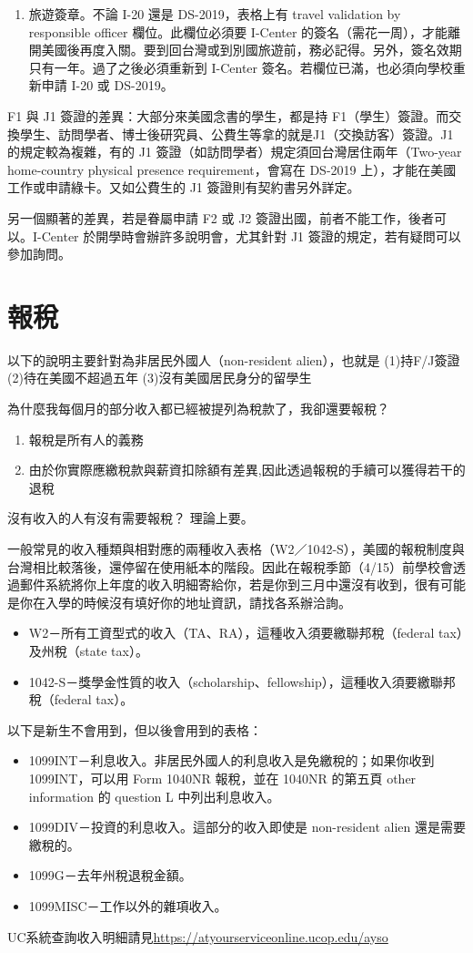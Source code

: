 \documentclass[10pt,a4paper]{book}
\begin{document}
\begin{CJK}{UTF8}{bkai}
\begin{enumerate}
\item 旅遊簽章。不論 I-20 還是 DS-2019，表格上有 travel validation by responsible officer 欄位。此欄位必須要 I-Center 的簽名（需花一周），才能離開美國後再度入關。要到回台灣或到別國旅遊前，務必記得。另外，簽名效期只有一年。過了之後必須重新到 I-Center 簽名。若欄位已滿，也必須向學校重新申請 I-20 或 DS-2019。
\end{enumerate}

F1 與 J1 簽證的差異：大部分來美國念書的學生，都是持 F1（學生）簽證。而交換學生、訪問學者、博士後研究員、公費生等拿的就是J1（交換訪客）簽證。J1 的規定較為複雜，有的 J1 簽證（如訪問學者）規定須回台灣居住兩年（Two-year home-country physical presence requirement，會寫在 DS-2019 上），才能在美國工作或申請綠卡。又如公費生的 J1 簽證則有契約書另外詳定。

另一個顯著的差異，若是眷屬申請 F2 或 J2 簽證出國，前者不能工作，後者可以。I-Center 於開學時會辦許多說明會，尤其針對 J1 簽證的規定，若有疑問可以參加詢問。

\section{報稅}
以下的說明主要針對為非居民外國人（non-resident alien），也就是 (1)持F/J簽證 (2)待在美國不超過五年 (3)沒有美國居民身分的留學生

為什麼我每個月的部分收入都已經被提列為稅款了，我卻還要報稅？
\begin{enumerate}
\item 報稅是所有人的義務
\item 由於你實際應繳稅款與薪資扣除額有差異,因此透過報稅的手續可以獲得若干的退稅
\end{enumerate}

沒有收入的人有沒有需要報稅？
理論上要。

一般常見的收入種類與相對應的兩種收入表格（W2／1042-S），美國的報稅制度與台灣相比較落後，還停留在使用紙本的階段。因此在報稅季節（4/15）前學校會透過郵件系統將你上年度的收入明細寄給你，若是你到三月中還沒有收到，很有可能是你在入學的時候沒有填好你的地址資訊，請找各系辦洽詢。
\begin{itemize}
\item W2－所有工資型式的收入（TA、RA），這種收入須要繳聯邦稅（federal tax）及州稅（state tax）。
\item 1042-S－獎學金性質的收入（scholarship、fellowship），這種收入須要繳聯邦稅（federal tax）。
\end{itemize}

以下是新生不會用到，但以後會用到的表格：
\begin{itemize}
\item 1099INT－利息收入。非居民外國人的利息收入是免繳稅的；如果你收到 1099INT，可以用 Form 1040NR 報稅，並在 1040NR 的第五頁 other information 的 question L 中列出利息收入。
\item 1099DIV－投資的利息收入。這部分的收入即使是 non-resident alien 還是需要繳稅的。
\item 1099G－去年州稅退稅金額。
\item 1099MISC－工作以外的雜項收入。
\end{itemize}
UC系統查詢收入明細請見\url{https://atyourserviceonline.ucop.edu/ayso}


\end{CJK}
\end{document}
